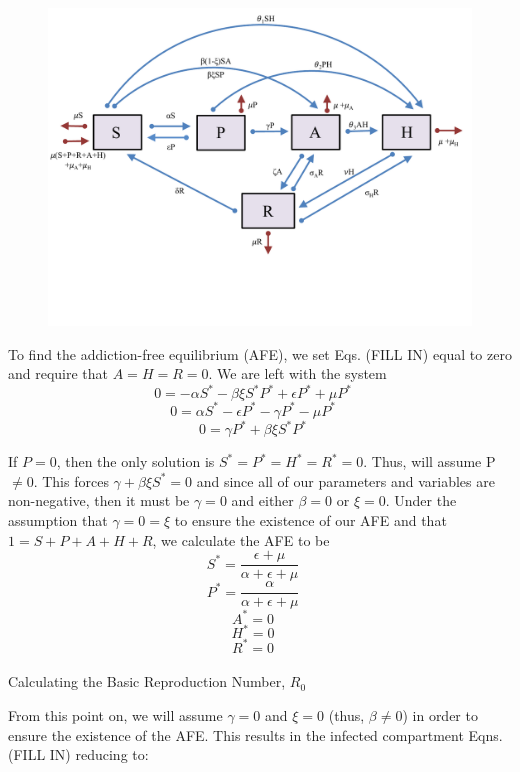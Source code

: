 \documentclass[12pt]{article}
\begin{document}
\begin{figure}
\includegraphics[scale=0.66]{heroin_schematic.pdf}
\end{figure}


To find the addiction-free equilibrium (AFE), we set Eqs. (FILL IN) equal to zero and require that $A=H=R=0$. We are left with the system \\

\[0=-\alpha S^* -\beta \xi S^* P^* + \epsilon P^* +\mu P^* \quad\]
\[0=\alpha S^* - \epsilon P^* -\gamma P^* - \mu P^* \quad\]
\[0=\gamma P^* + \beta \xi S^* P^*   \quad\]



If $P=0$, then the only solution is $S^*=P^*=H^*=R^*=0$. Thus, will assume P $\neq 0. $ This forces $\gamma + \beta \xi S^* =0$ and since all of our parameters and variables are non-negative, then it must be $\gamma=0$ and either $\beta=0$ or $\xi=0$. Under the assumption that $\gamma=0=\xi$ to ensure the existence of our AFE and that $1=S+P+A+H+R$, we calculate the AFE to be \\

\[S^*=\frac{\epsilon + \mu}{\alpha + \epsilon +\mu}\quad\]
\[P^*=\frac{\alpha}{\alpha + \epsilon +\mu}\quad\]
\[A^*=0\quad\]
\[H^*=0\quad\]
\[R^*=0\quad\] \\




Calculating the Basic Reproduction Number, $R_0$

From this point on, we will assume $\gamma =0$ and $\xi =0$ (thus, $\beta \neq 0$) in order to ensure the existence of the AFE. This results in the infected compartment Eqns. (FILL IN) reducing to:
\end{document}

